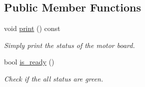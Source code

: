\subsection*{Public Member Functions}
\begin{DoxyCompactItemize}
\item 
\mbox{\label{classblmc__drivers_1_1MotorBoardStatus_abae870151b4e76163d2e3ef6a209e555}} 
void \hyperlink{classblmc__drivers_1_1MotorBoardStatus_abae870151b4e76163d2e3ef6a209e555}{print} () const
\begin{DoxyCompactList}\small\item\em Simply print the status of the motor board. \end{DoxyCompactList}\item 
bool \hyperlink{classblmc__drivers_1_1MotorBoardStatus_a1da75ba70f6ad31fa7c880b5c673cc89}{is\+\_\+ready} ()
\begin{DoxyCompactList}\small\item\em Check if the all status are green. \end{DoxyCompactList}\end{DoxyCompactItemize}
